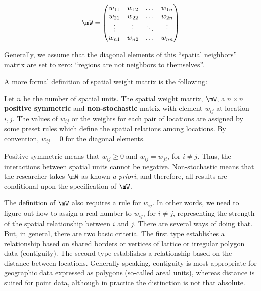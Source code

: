 \documentclass[english,12pt]{book}\usepackage[]{graphicx}\usepackage[]{xcolor}
\begin{document}
\begin{equation*}
\mW = \begin{pmatrix}
        w_{11} & w_{12} & \hdots & w_{1n} \\ 
        w_{21} & w_{22} & \hdots & w_{2n} \\
        \vdots & \vdots & \ddots & \vdots \\
        w_{n1} & w_{n2} & \hdots & w_{nn} 
      \end{pmatrix}
\end{equation*}

Generally, we assume that the diagonal elements of this ``spatial neighbors'' matrix are set to zero: ``regions are not neighbors to themselves''.

A more formal definition of spatial weight matrix is the following:

\begin{definition}\label{def:W}
  Let $n$ be the number of spatial units. The spatial weight matrix, $\mW$, a $n\times n$ \textbf{positive symmetric} and \textbf{non-stochastic} matrix with element $w_{ij}$ at location $i,j$. The values of $w_{ij}$ or the weights for each pair of locations are assigned by some preset rules which define the spatial relations among locations. By convention, $w_{ij} = 0$ for the diagonal elements.
\end{definition}

Positive symmetric means that $w_{ij}\geq 0$ and $w_{ij} = w_{ji}$, for $i\neq j$. Thus, the interactions between spatial units cannot be negative. Non-stochastic means that the researcher takes $\mW$ as known \emph{a priori}, and therefore, all results are conditional upon the specification of $\mW$.

The definition of $\mW$ also requires a rule for $w_{ij}$. In other words, we need to figure out how to assign a real number to $w_{ij}$, for $i\neq j$, representing the strength of the spatial relationship between $i$ and $j$. There are several ways of doing that. But, in general, there are two basic criteria. The first type establishes a relationship based on shared borders or vertices of lattice or irregular polygon data (contiguity). The second type establishes a relationship based on the distance between locations. Generally speaking, contiguity is most appropriate for geographic data expressed as polygons (so-called areal units), whereas distance is suited for point data, although in practice the distinction is not that absolute. 
\end{document}
